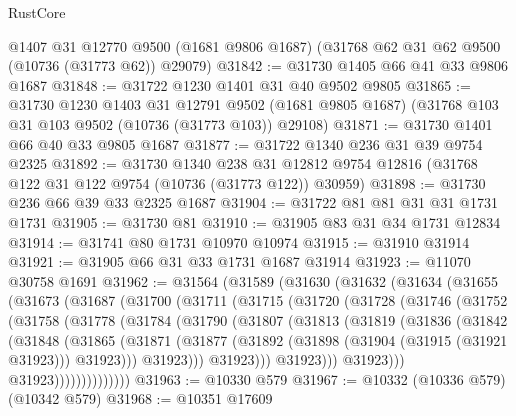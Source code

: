 \begin{lexlean}{RustCore}
\begin{coremodule}
    @1407
    @31
    @12770
    @9500
    (@1681 @9806 @1687)
    (@31768 @62 @31 @62 @9500 (@10736 (@31773 @62)) @29079)
@31842 := @31730 @1405 @66 @41 @33 @9806 @1687
@31848 := @31722 @1230 @1401 @31 @40 @9502 @9805
@31865 := @31730
    @1230
    @1403
    @31
    @12791
    @9502
    (@1681 @9805 @1687)
    (@31768 @103 @31 @103 @9502 (@10736 (@31773 @103)) @29108)
@31871 := @31730 @1401 @66 @40 @33 @9805 @1687
@31877 := @31722 @1340 @236 @31 @39 @9754 @2325
@31892 := @31730
    @1340
    @238
    @31
    @12812
    @9754
    @12816
    (@31768 @122 @31 @122 @9754 (@10736 (@31773 @122)) @30959)
@31898 := @31730 @236 @66 @39 @33 @2325 @1687
@31904 := @31722 @81 @81 @31 @31 @1731 @1731
@31905 := @31730 @81
@31910 := @31905 @83 @31 @34 @1731 @12834
@31914 := @31741 @80 @1731 @10970 @10974
@31915 := @31910 @31914
@31921 := @31905 @66 @31 @33 @1731 @1687 @31914
@31923 := @11070 @30758 @1691
@31962 := @31564
    (@31589
      (@31630
        (@31632
          (@31634
            (@31655
              (@31673
                (@31687
                  (@31700
                    (@31711
                      (@31715
                        (@31720
                          (@31728
                            (@31746
                              (@31752
                                (@31758
                                  (@31778
                                    (@31784
                                      (@31790
                                        (@31807
                                          (@31813
                                            (@31819
                                              (@31836
                                                (@31842
                                                  (@31848
                                                    (@31865
                                                      (@31871
                                                        (@31877
                                                          (@31892
                                                            (@31898
                                                              (@31904 (@31915 (@31921 @31923)))
                                                              @31923)))
                                                        @31923)))
                                                  @31923)))
                                            @31923)))
                                      @31923)))
                                @31923))))))))))))))
@31963 := @10330 @579
@31967 := @10332 (@10336 @579) (@10342 @579)
@31968 := @10351 @17609

\end{coremodule}
\end{lexlean}
